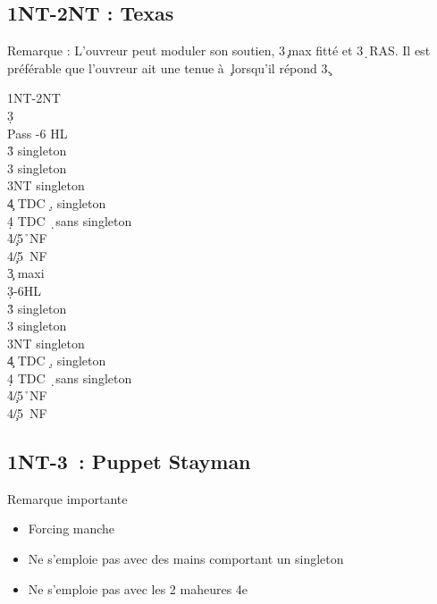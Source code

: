 \documentclass[a4paper]{article}
\begin{document}
\subsection{1NT-2NT : Texas \pdfd}

Remarque : L'ouvreur peut moduler son soutien, 3\c\ max fitté et 3\d\ RAS.
Il est préférable que l'ouvreur ait une tenue à \c\ lorsqu'il répond 3\c .

\begin{bidtable}
1NT-2NT\\
3\d\+\\
Pass -6 HL\\
3\h \> singleton \s \\
3\s \> singleton \h \\
3NT \> singleton \c \\
4\c \> TDC \d , singleton \c \\
4\d \> TDC \d\ sans singleton\\
4\h {}\c /5\h\ NF\\
4\s {}\c /5\s\ NF\-\\
3\c \> maxi\+\\
3\d {}-6HL\\
3\h \> singleton \s \\
3\s \> singleton \h \\
3NT \> singleton \c \\
4\c \> TDC \d , singleton \c \\
4\d \> TDC \d\ sans singleton\\
4\h {}\c /5\h\ NF\\
4\s {}\c /5\s\ NF\-
\end{bidtable}

\subsection{1NT-3\pdfc\ : Puppet Stayman}

Remarque importante

\begin{itemize}
\item Forcing manche

\item Ne s'emploie pas avec des mains comportant un singleton 

\item Ne s'emploie pas avec les 2 maheures 4e

\end{itemize}
\end{document}

